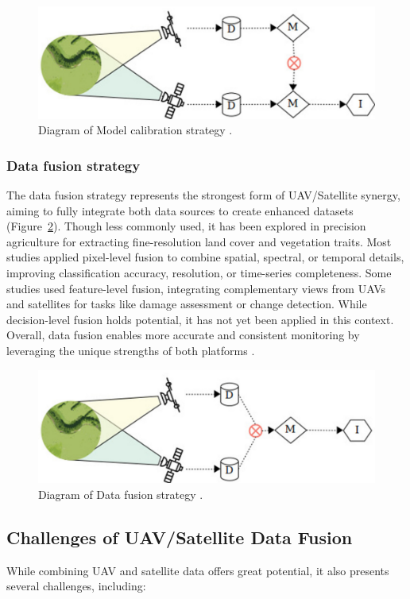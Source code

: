 \begin{figure}[H]
    \centering
    \includegraphics[width=0.6
    \textwidth]{chapters/chapter3/images/Figure14.png}
    \caption{Diagram of Model calibration strategy \parencite{AlvarezVanhard2021}.}
    \label{fig:ModelCalibration}
\end{figure}


\subsubsection{Data fusion strategy}

The data fusion strategy represents the strongest form of UAV/Satellite synergy, aiming to fully integrate both data sources to create enhanced datasets (Figure~\ref{fig:DataFusion}). Though less commonly used, it has been explored in precision agriculture for extracting fine-resolution land cover and vegetation traits. Most studies applied pixel-level fusion to combine spatial, spectral, or temporal details, improving classification accuracy, resolution, or time-series completeness. Some studies used feature-level fusion, integrating complementary views from UAVs and satellites for tasks like damage assessment or change detection. While decision-level fusion holds potential, it has not yet been applied in this context. Overall, data fusion enables more accurate and consistent monitoring by leveraging the unique strengths of both platforms \parencite{AlvarezVanhard2021}.

\begin{figure}[H]
    \centering
    \includegraphics[width=0.6
    \textwidth]{chapters/chapter3/images/Figure15.png}
    \caption{Diagram of Data fusion strategy \parencite{AlvarezVanhard2021}.}
    \label{fig:DataFusion}
\end{figure}

\subsection{Challenges of UAV/Satellite Data Fusion}
While combining UAV and satellite data offers great potential, it also presents several challenges, including:

